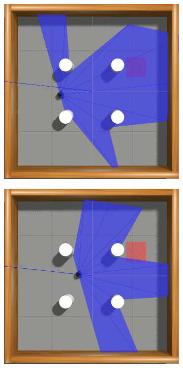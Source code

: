 \begin{figure}[htbp]
\begin{subfigure}[b]{0.115\textwidth}
    \end{subfigure}
    \hfill
    \begin{subfigure}[b]{0.115\textwidth}
        \includegraphics[width=\textwidth]{images/simenv2/3.png}
    \end{subfigure}
    \hfill
    \begin{subfigure}[b]{0.115\textwidth}
        \includegraphics[width=\textwidth]{images/simenv2/4.png}

\end{subfigure}
\end{figure}
